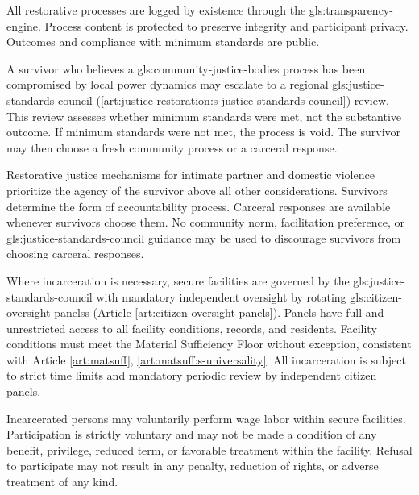 All restorative processes are logged by existence through the \gls{gls:transparency-engine}. Process content is protected to preserve integrity and participant privacy. Outcomes and compliance with minimum standards are public.

A survivor who believes a \gls{gls:community-justice-bodies} process has been compromised by local power dynamics may escalate to a regional \gls{gls:justice-standards-council} (\ref{art:justice-restoration:s-justice-standards-council}) review. This review assesses whether minimum standards were met, not the substantive outcome. If minimum standards were not met, the process is void. The survivor may then choose a fresh community process or a carceral response.

Restorative justice mechanisms for intimate partner and domestic violence prioritize the agency of the survivor above all other considerations. Survivors determine the form of accountability process. Carceral responses are available whenever survivors choose them. No community norm, facilitation preference, or \gls{gls:justice-standards-council} guidance may be used to discourage survivors from choosing carceral responses.

Where incarceration is necessary, secure facilities are governed by the \gls{gls:justice-standards-council} with mandatory independent oversight by rotating \gls{gls:citizen-oversight-panels}s (Article \ref{art:citizen-oversight-panels}). Panels have full and unrestricted access to all facility conditions, records, and residents. Facility conditions must meet the Material Sufficiency Floor without exception, consistent with Article \ref{art:matsuff}, \ref{art:matsuff:s-universality}. All incarceration is subject to strict time limits and mandatory periodic review by independent citizen panels.

Incarcerated persons may voluntarily perform wage labor within secure facilities. Participation is strictly voluntary and may not be made a condition of any benefit, privilege, reduced term, or favorable treatment within the facility. Refusal to participate may not result in any penalty, reduction of rights, or adverse treatment of any kind.

